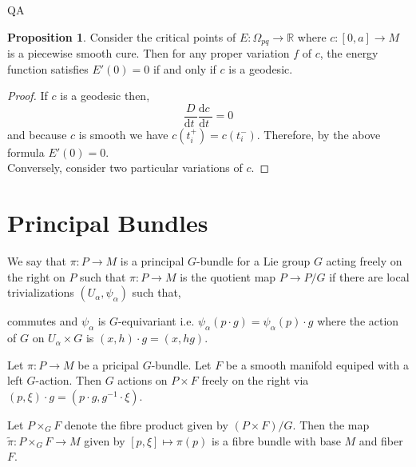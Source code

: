 QA	 \documentclass[12pt]{extarticle}
\newcommand{\R}{\mathbb{R}}
\renewcommand{\d}[1]{ \mathrm{d}#1 \:}
\newcommand{\deriv}[2]{\frac{\d{#1}}{\d{#2}}}
\theoremstyle{definition}
\newtheorem{proposition}[theorem]{Proposition}
\newenvironment{definition}[1][Definition:]{\begin{trivlist}
\item[\hskip \labelsep {\bfseries #1}]}{\end{trivlist}}
\begin{document}
\begin{proposition}
Consider the critical points of $E : \Omega_{pq} \to \R$ where $c : [0, a] \to M$ is a piecewise smooth cure. Then for any proper variation $f$ of $c$, the energy function satisfies $E'(0) = 0$ if and only if $c$ is a geodesic. 
\end{proposition}

\begin{proof}
If $c$ is a geodesic then,
\[ \frac{D}{\d{t}} \deriv{c}{t} = 0 \]
and because $c$ is smooth we have $c(t_i^+) = c(t_i^-)$. Therefore, by the above formula $E'(0) = 0$.
\bigskip\\
Conversely, consider two particular variations of $c$. 
\end{proof}

\section{Principal Bundles}

\begin{definition}
We say that $\pi : P \to M$ is a principal $G$-bundle for a Lie group $G$ acting freely on the right on $P$ such that $\pi : P \to M$ is the quotient map $P \to P / G$ if there are local trivializations $(U_\alpha, \psi_\alpha)$ such that,
\begin{center}
\end{center}
commutes and $\psi_\alpha$ is $G$-equivariant i.e. $\psi_\alpha(p \cdot g) = \psi_\alpha(p) \cdot g$ where the action of $G$ on $U_\alpha \times G$ is $(x, h) \cdot g = (x, hg)$. 
\end{definition}

\begin{definition}
Let $\pi : P \to M$ be a pricipal $G$-bundle. Let $F$ be a smooth manifold equiped with a left $G$-action. Then $G$ actions on $P \times F$ freely on the right via $(p, \xi) \cdot g = (p \cdot g, g^{-1} \cdot \xi)$. 
\end{definition}

\begin{definition}
Let $P \times_G F$ denote the fibre product given by $(P \times F)/G$. Then the map $\tilde{\pi} : P \times_G F \to M$ given by $[p, \xi] \mapsto \pi(p)$ is a fibre bundle with base $M$ and fiber $F$. 
\end{definition}
\end{document}
